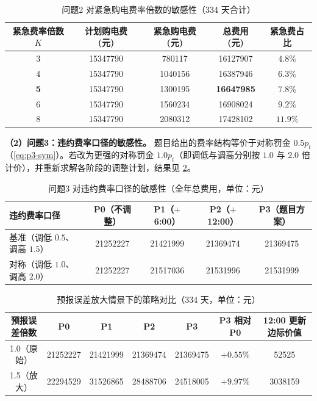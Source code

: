 \begin{table}[H]
  \centering
  \caption{问题2 对紧急购电费率倍数的敏感性（334 天合计）}
  \label{tab:sens-k}
  \small
  \begin{tabular}{ccccc}
    \toprule[1.5pt]
    紧急费率倍数 $K$ & 计划购电费 (元) & 紧急购电费 (元) & 总费用 (元) & 紧急费占比 \\
    \midrule[1pt]
    3 & 15347790 & 780117  & 16127907 & $4.8\%$ \\
    4 & 15347790 & 1040156 & 16387946 & $6.3\%$ \\
    \textbf{5} & 15347790 & 1300195 & \textbf{16647985} & $7.8\%$ \\
    6 & 15347790 & 1560234 & 16908024 & $9.2\%$ \\
    8 & 15347790 & 2080312 & 17428102 & $11.9\%$ \\
    \bottomrule[1.5pt]
  \end{tabular}
\end{table}

\textbf{（2）问题3：违约费率口径的敏感性。} 题目给出的费率结构等价于对称罚金 $0.5p_t$（\cref{eq:p3-sym}）。若改为更强的对称罚金 $1.0p_t$（即调低与调高分别按 $1.0$ 与 $2.0$ 倍计价），并重新求解各阶段的调整计划，结果见 \cref{tab:sens-dev}。

\begin{table}[H]
  \centering
  \caption{问题3 对违约费率口径的敏感性（全年总费用，单位：元）}
  \label{tab:sens-dev}
  \small
  \begin{tabular}{lcccc}
    \toprule[1.5pt]
    违约费率口径 & P0（不调整） & P1（$+$6:00） & P2（$+$12:00） & P3（题目方案） \\
    \midrule[1pt]
    基准（调低 $0.5$、调高 $1.5$） & 21252227 & 21421999 & 21369474 & 21369475 \\
    对称（调低 $1.0$、调高 $2.0$） & 21252227 & 21517036 & 21531996 & 21531999 \\
    \bottomrule[1.5pt]
  \end{tabular}
\end{table}

\begin{table}[H]
  \centering
  \caption{预报误差放大情景下的策略对比（334 天，单位：元）}
  \label{tab:sens-fc}
  \footnotesize
  \begin{tabular}{ccccccc}
    \toprule[1.5pt]
    预报误差倍数 & P0 & P1 & P2 & P3 & P3 相对 P0 & 12:00 更新边际价值 \\
    \midrule[1pt]
    1.0（原始） & 21252227 & 21421999 & 21369474 & 21369475 & $+0.55\%$ & 52525 \\
    1.5（放大） & 22294529 & 31526865 & 28488706 & 24518005 & $+9.97\%$ & 3038159 \\
    \bottomrule[1.5pt]
  \end{tabular}
  \par{}
\end{table}

